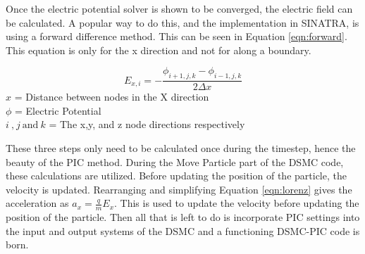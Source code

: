\indent Once the electric potential solver is shown to be converged, the electric field can be calculated. A popular way to do this, and the implementation in SINATRA, is using a forward difference method. This can be seen in Equation \ref{eqn:forward}. This equation is only for the x direction and not for along a boundary. \par

\begin{equation}
    \label{eqn:forward}
    E_{x,i} = - \frac{\phi_{i+1,j,k} - \phi_{i-1,j,k}}{2 \Delta x}
\end{equation}
\(x\) = Distance between nodes in the X direction \\
\(\phi\) = Electric Potential \\
\(i \: \text{,} \: j \: \text{and} \: k\) = The x,y, and z node directions respectively  \par

\indent These three steps only need to be calculated once during the timestep, hence the beauty of the PIC method. During the Move Particle part of the DSMC code, these calculations are utilized. Before updating the position of the particle, the velocity is updated. Rearranging and simplifying Equation \ref{eqn:lorenz} gives the acceleration as \(a_x = \frac{q}{m} E_x\). This is used to update the velocity before updating the position of the particle. Then all that is left to do is incorporate PIC settings into the input and output systems of the DSMC and a functioning DSMC-PIC code is born. 








